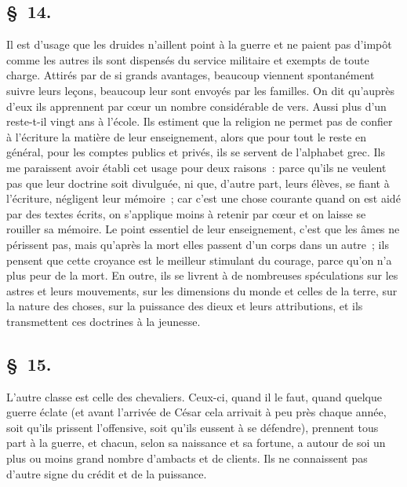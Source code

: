 \documentclass[french,twoside]{book} %
\begin{document}
\subsection[{§ 14.}]{ \textsc{§ 14.} }
\noindent Il est d’usage que les druides n’aillent point à la guerre et ne paient pas d’impôt comme les autres ils sont dispensés du service militaire et exempts de toute charge. Attirés par de si grands avantages, beaucoup viennent spontanément suivre leurs leçons, beaucoup leur sont envoyés par les familles. On dit qu’auprès d’eux ils apprennent par cœur un nombre considérable de vers. Aussi plus d’un reste-t-il vingt ans à l’école. Ils estiment que la religion ne permet pas de confier à l’écriture la matière de leur enseignement, alors que pour tout le reste en général, pour les comptes publics et privés, ils se servent de l’alphabet grec. Ils me paraissent avoir établi cet usage pour deux raisons : parce qu’ils ne veulent pas que leur doctrine soit divulguée, ni que, d’autre part, leurs élèves, se fiant à l’écriture, négligent leur mémoire ; car c’est une chose courante quand on est aidé par des textes écrits, on s’applique moins à retenir par cœur et on laisse se rouiller sa mémoire. Le point essentiel de leur enseignement, c’est que les âmes ne périssent pas, mais qu’après la mort elles passent d’un corps dans un autre ; ils pensent que cette croyance est le meilleur stimulant du courage, parce qu’on n’a plus peur de la mort. En outre, ils se livrent à de nombreuses spéculations sur les astres et leurs mouvements, sur les dimensions du monde et celles de la terre, sur la nature des choses, sur la puissance des dieux et leurs attributions, et ils transmettent ces doctrines à la jeunesse.
\subsection[{§ 15.}]{ \textsc{§ 15.} }
\noindent L'autre classe est celle des chevaliers. Ceux-ci, quand il le faut, quand quelque guerre éclate (et avant l’arrivée de César cela arrivait à peu près chaque année, soit qu’ils prissent l’offensive, soit qu’ils eussent à se défendre), prennent tous part à la guerre, et chacun, selon sa naissance et sa fortune, a autour de soi un plus ou moins grand nombre d’ambacts et de clients. Ils ne connaissent pas d’autre signe du crédit et de la puissance.
\end{document}
